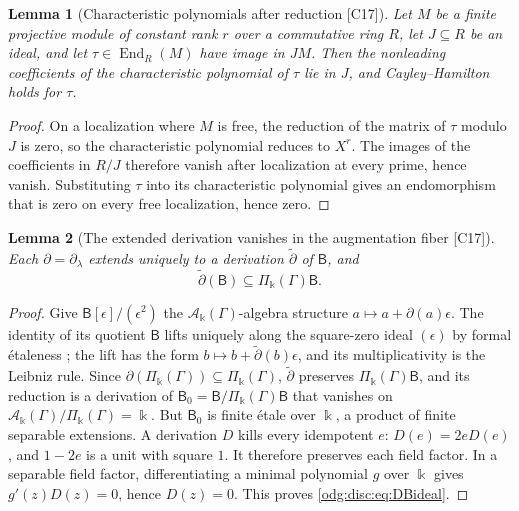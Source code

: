 \documentclass[11pt,oneside]{article}
\numberwithin{equation}{section}
\newtheorem{lemma}[lemma]{Lemma}
\theoremstyle{definition}
\theoremstyle{remark}
\newcommand{\src}[1]{\textup{\textsf{\small[#1]}}}
\newcommand{\crA}{\mathcal A_\Bbbk(\Gamma)}
\newcommand{\crP}{\Pi_\Bbbk(\Gamma)}
\newcommand{\End}{\operatorname{End}}
\begin{document}
\begin{lemma}[Characteristic polynomials after reduction \src{C17}]\label{odg:disc:lem:reduction}
Let $M$ be a finite projective module of constant rank $r$ over a commutative ring $R$,
let $J\subseteq R$ be an ideal, and let $\tau\in\End_R(M)$ have image in $JM$. Then the
nonleading coefficients of the characteristic polynomial of $\tau$ lie in $J$, and
Cayley--Hamilton holds for $\tau$.
\end{lemma}
\begin{proof}
On a localization where $M$ is free, the reduction of the matrix of $\tau$ modulo $J$ is
zero, so the characteristic polynomial reduces to $X^r$. The images of the coefficients
in $R/J$ therefore vanish after localization at every prime, hence vanish. Substituting
$\tau$ into its characteristic polynomial gives an endomorphism that is zero on every free
localization, hence zero.
\end{proof}

\begin{lemma}[The extended derivation vanishes in the augmentation fiber \src{C17}]\label{odg:disc:lem:etaleD}
Each $\partial=\partial_\lambda$ extends uniquely to a derivation $\widetilde\partial$ of
$\mathsf B$, and
\begin{equation}\label{odg:disc:eq:DBideal}
 \widetilde\partial(\mathsf B)\subseteq\crP\mathsf B .
\end{equation}
\end{lemma}
\begin{proof}
Give $\mathsf B[\epsilon]/(\epsilon^2)$ the $\crA$-algebra structure
$a\mapsto a+\partial(a)\epsilon$. The identity of its quotient $\mathsf B$ lifts uniquely
along the square-zero ideal $(\epsilon)$ by formal \'etaleness \cite{StacksFormal}; the lift
has the form $b\mapsto b+\widetilde\partial(b)\epsilon$, and its multiplicativity is the
Leibniz rule. Since $\partial(\crP)\subseteq\crP$, $\widetilde\partial$ preserves
$\crP\mathsf B$, and its reduction is a derivation of $\mathsf B_0=\mathsf B/\crP\mathsf B$
that vanishes on $\crA/\crP=\Bbbk$. But $\mathsf B_0$ is finite \'etale over $\Bbbk$, a
product of finite separable extensions. A derivation $D$ kills every idempotent $e$:
$D(e)=2eD(e)$, and $1-2e$ is a unit with square $1$. It therefore preserves each field
factor. In a separable field factor, differentiating a minimal polynomial $g$ over
$\Bbbk$ gives $g'(z)D(z)=0$, hence $D(z)=0$. This proves
\eqref{odg:disc:eq:DBideal}.
\end{proof}
\end{document}
